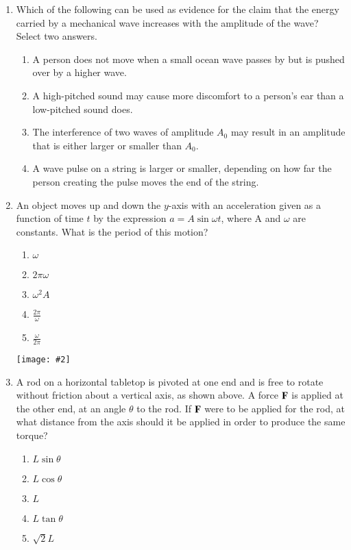 \documentclass[11pt]{article}
\newcommand{\pic}[2]{\texttt{[image: \#2]}}
\newcommand{\mb}[1]{\ensuremath\mathbf{#1}}
\begin{document}
\begin{multicols}{2}
\begin{enumerate}[leftmargin=18pt,resume]
  \item Which of the following can be used as evidence for the claim that the
    energy carried by a mechanical wave increases with the amplitude of the
    wave? Select two answers.
    \begin{enumerate}[noitemsep,topsep=0pt,leftmargin=18pt,label=(\Alph*)]
    \item A person does not move when a small ocean wave passes by but is pushed
      over by a higher wave.
    \item A high-pitched sound may cause more discomfort to a person's ear than
      a low-pitched sound does.
    \item The interference of two waves of amplitude $A_0$ may result in an
      amplitude that is either larger or smaller than $A_0$.
    \item A wave pulse on a string is larger or smaller, depending on how far
      the person creating the pulse moves the end of the string.
    \end{enumerate}

  \item An object moves up and down the $y$-axis with an acceleration given as
    a function of time $t$ by the expression $a=A\sin\omega t$, where A and
    $\omega$ are constants. What is the period of this motion?
    \begin{enumerate}[noitemsep,topsep=0pt,leftmargin=18pt,label=(\Alph*)]    
    \item $\omega$
    \item $2\pi\omega$
    \item $\omega^2A$
    \item $\displaystyle\frac{2\pi}{\omega}$
    \item $\displaystyle\frac{\omega}{2\pi}$
    \end{enumerate}
    \columnbreak
    
    \begin{center}
      \pic{.3}{rod}
    \end{center}
  \item A rod on a horizontal tabletop is pivoted at one end and is free to
    rotate without friction about a vertical axis, as shown above. A force
    $\mb{F}$ is applied at the other end, at an angle $\theta$ to the rod. If
    $\mb{F}$ were to be applied for the rod, at what distance from the axis
    should it be applied in order to produce the same torque?
    \begin{enumerate}[noitemsep,topsep=0pt,leftmargin=18pt,label=(\Alph*)]
    \item$L\sin\theta$
    \item$L\cos\theta$
    \item$L$
    \item$L\tan\theta$
    \item$\sqrt{2}L$
    \end{enumerate}


\end{enumerate}
\end{multicols}
\end{document}
